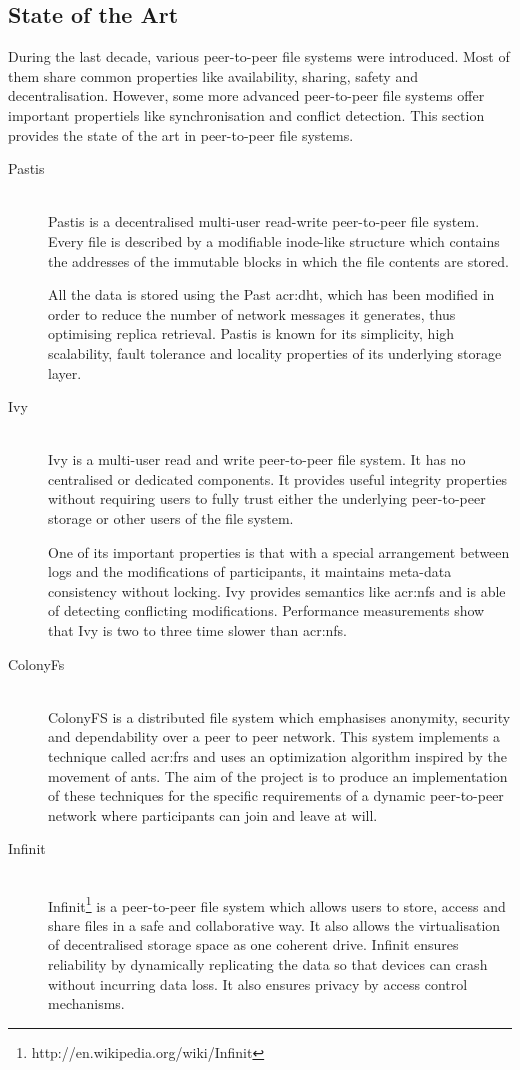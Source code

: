 \subsection{State of the Art}

During the last decade, various peer-to-peer file systems were introduced. Most of them share common properties like availability, sharing, safety and decentralisation. However, some more advanced peer-to-peer file systems offer important propertiels like synchronisation and conflict detection. This section provides the state of the art in peer-to-peer file systems.

\begin{description}
	\item[Pastis]\-\\
	Pastis \cite{Busca:2005gt} is a decentralised multi-user read-write peer-to-peer file system. Every file is described by
a modifiable inode-like structure which contains the addresses of the immutable blocks in which the file contents are stored.

All the data is stored using the Past \gls{acr:dht}, which has been modified in order to reduce the number of network messages it generates, thus optimising replica retrieval. Pastis is known for its simplicity, high scalability, fault tolerance and locality properties of its underlying storage layer.
	\item[Ivy]\-\\
	Ivy \cite{Muthitacharoen:2002iv} is a multi-user read and write peer-to-peer file system. It has no centralised or dedicated components. It provides useful integrity properties without requiring users to fully trust either the underlying peer-to-peer storage or other users of the file system.
	
	One of its important properties is that with a special arrangement between logs and the modifications of participants, it maintains meta-data consistency without locking. Ivy provides semantics like \gls{acr:nfs} and is able of detecting conflicting modifications. Performance measurements show that Ivy is two to three time slower than \gls{acr:nfs}.
	\item[ColonyFs]\-\\
	ColonyFS \cite{Colony:2009fs} is a distributed file system which emphasises anonymity, security and dependability over a peer to peer network. This system implements a technique called \gls{acr:frs} and uses an optimization algorithm inspired by the movement of ants. The aim of the project is to produce an implementation of these techniques for the specific requirements of a dynamic peer-to-peer network where participants can join and leave at will.
	\item[Infinit]\-\\
	Infinit\footnote{http://en.wikipedia.org/wiki/Infinit} is a peer-to-peer file system which allows users to store, access and share files in a safe and collaborative way. It also allows the virtualisation of decentralised storage space as one coherent drive. Infinit ensures reliability by dynamically replicating the data so that devices can crash without incurring data loss. It also ensures privacy by access control mechanisms.
	

\end{description}
